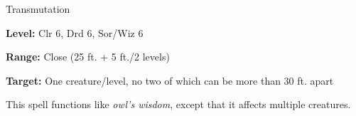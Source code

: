 \label{spell:Mass Owl's Wisdom}

Transmutation

\textbf{Level:} Clr 6, Drd 6, Sor/Wiz 6

\textbf{Range:} Close (25 ft. + 5 ft./2 levels)

\textbf{Target:} One creature/level, no two of which can be more than 30 ft. apart

This spell functions like \textit{owl's wisdom}, except that it affects multiple 
creatures.




